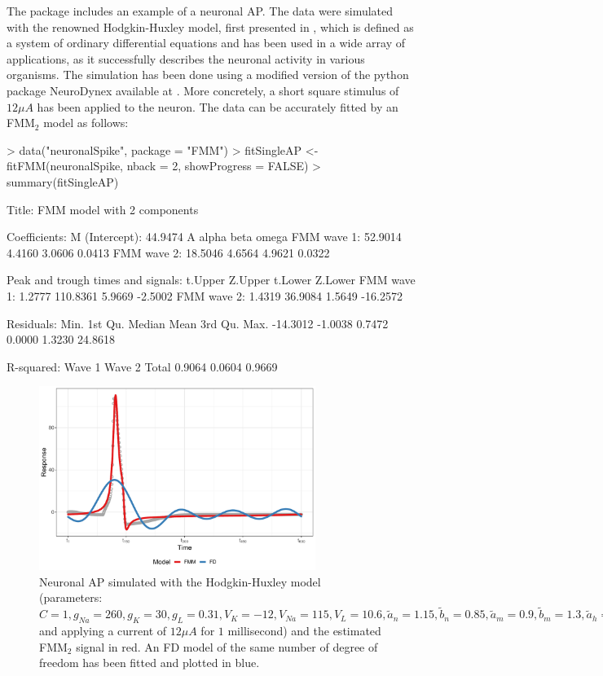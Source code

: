 The package includes an example of a neuronal AP. The data were simulated with the renowned Hodgkin-Huxley model, first presented in \cite{Hodgkin+Huxley:1952}, which is defined as a system of ordinary differential equations and has been used in a wide array of applications, as it successfully describes the neuronal activity in various organisms. The simulation has been done using a modified version of the python package NeuroDynex available at \cite{Gerstner+Kistler+Naud+Paninski:2014}. More concretely, a short square stimulus of $12 \mu A$ has been applied to the neuron.
The data can be accurately fitted by an FMM$_2$ model as follows:
%
\begin{example}
> data("neuronalSpike", package = "FMM")
> fitSingleAP <- fitFMM(neuronalSpike, nback = 2, showProgress = FALSE)
> summary(fitSingleAP)

Title:
FMM model with 2 components

Coefficients:
M (Intercept): 44.9474
                   A  alpha   beta  omega
FMM wave 1:  52.9014 4.4160 3.0606 0.0413
FMM wave 2:  18.5046 4.6564 4.9621 0.0322

Peak and trough times and signals:
             t.Upper  Z.Upper t.Lower  Z.Lower
FMM wave 1:   1.2777 110.8361  5.9669  -2.5002
FMM wave 2:   1.4319  36.9084  1.5649 -16.2572

Residuals:
    Min.  1st Qu.   Median     Mean  3rd Qu.     Max. 
-14.3012  -1.0038   0.7472   0.0000   1.3230  24.8618 

R-squared:
Wave 1 Wave 2  Total 
0.9064 0.0604 0.9669 
\end{example}
%

\begin{figure}[h]
	\centering
	\includegraphics[width=0.8\textwidth]{Figure_singleAP_Example.pdf}
	\caption{Neuronal AP simulated with the Hodgkin-Huxley model (parameters: $C=1, g_{Na}=260, g_{K}=30, g_{L}=0.31, V_{K}=-12, V_{Na}=115, V_{L}=10.6, \widetilde{a}_n=1.15, \widetilde{b}_n=0.85, \widetilde{a}_m=0.9, \widetilde{b}_m=1.3, \widetilde{a}_h=1, \widetilde{b}_h=1$ and applying a current of $12 \mu A$ for $1$ millisecond) and the estimated FMM$_2$ signal in red. An FD model of the same number of degree of freedom has been fitted and plotted in blue.}
	\label{f:FigureNeuro}
\end{figure}


